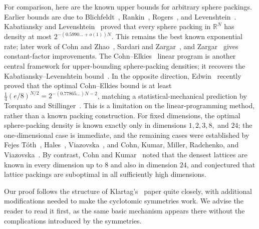 \documentclass[11pt]{article}
\theoremstyle{remark}
\begin{document}
For comparison, here are the known upper bounds for arbitrary sphere packings.
Earlier bounds are due to Blichfeldt~\cite{Blichfeldt},
Rankin~\cite{Rankin}, Rogers~\cite{RogersPacking}, and
Levenshtein~\cite{Levenshtein}.
Kabatiansky and Levenshtein~\cite{KabatianskyLevenshtein}
proved that every sphere packing in $\mathbb R^N$ has density at most
$2^{-(0.5990\ldots+o(1))N}$.
This remains the best known exponential rate; later work of Cohn and
Zhao~\cite{CohnZhao}, Sardari and Zargar~\cite{SardariZargar}, and
Zargar~\cite{Zargar} gives constant-factor improvements.
The Cohn--Elkies~\cite{CohnElkies} linear program is another central framework
for upper-bounding sphere-packing densities; it recovers the
Kabatiansky--Levenshtein bound~\cite{CohnZhao}.
In the opposite direction, Edwin~\cite{Edwin} recently proved
that the optimal Cohn--Elkies bound is at least
$\frac14(e/8)^{N/2}=2^{-(0.77865\ldots)N-2}$, matching a statistical-mechanical
prediction by Torquato and Stillinger~\cite{TorquatoStillinger}.  This is a
limitation
on the linear-programming method, rather than a known packing construction.
For fixed dimensions, the optimal sphere-packing density is known exactly only
in dimensions $1,2,3,8,$ and $24$; the one-dimensional case is immediate, and
the remaining cases were established by Fejes T\'oth~\cite{FejesToth},
Hales~\cite{Hales}, Viazovska~\cite{Viazovska}, and Cohn, Kumar, Miller,
Radchenko, and Viazovska~\cite{CKMRV}.  By contrast, Cohn and
Kumar~\cite{CohnKumar} noted that the densest lattices are known in every
dimension up to $8$ and also in dimension $24$, and conjectured that lattice
packings are suboptimal in all sufficiently high dimensions.

Our proof follows the structure of Klartag's~\cite{Klartag} paper quite
closely, with additional modifications needed to make the cyclotomic symmetries
work.  We advise the reader to read it first, as the same basic mechanism
appears there without the complications introduced by the symmetries.
\end{document}
